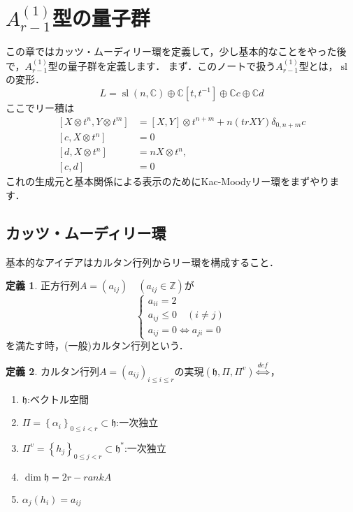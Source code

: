 \documentclass[dvipdfmx,autodetect-engine]{article}
\title{}
\author{}
\date{}
\theoremstyle{definition}
\newtheorem{Def}{定義}
\DeclareMathOperator{\sllie}{sl}
\begin{document}
\section{$A^{(1)}_{r-1}$型の量子群}
    この章ではカッツ・ムーディリー環を定義して，少し基本的なことをやった後で，$A^{(1)}_{r-1}$型の量子群を定義します．
    まず．このノートで扱う$A^{(1)}_{r-1}$型とは，$\sllie$の変形．
    \[
        L = \sllie(n, \mathbb{C}) \oplus \mathbb{C}[t, t^{-1}] \oplus \mathbb{C}c \oplus \mathbb{C}d
    \]
    ここでリー積は
    \begin{align*}
        \left[X \otimes t^{n}, Y \otimes t^{m}\right]
        &=[X, Y] \otimes t^{n+m}+n(t r X Y) \delta_{0, n+m} c\\
        \left[c, X \otimes t^{n}\right]
        &=0 \\
        \left[d, X \otimes t^{n}\right]
        &=n X \otimes t^{n}, \\
        [c, d]
        &=0
    \end{align*}
    これの生成元と基本関係による表示のためにKac-Moodyリー環をまずやります．
\subsection{カッツ・ムーディリー環}
    基本的なアイデアはカルタン行列からリー環を構成すること．
    \begin{Def}
        正方行列$A = (a_{ij}) \quad (a_{ij} \in \mathbb{Z})$が
        \[
            \begin{cases}
                a_{ii} = 2 \\
                a_{ij} \leq 0 \quad (i \neq j) \\
                a_{ij} = 0 \iff a_{ji} = 0
            \end{cases}
        \]
        を満たす時，(一般)カルタン行列という．
    \end{Def}
    
    \begin{Def}
        カルタン行列$A = (a_{ij})_{i \leq i \leq r}$の実現$(\mathfrak{h}, \Pi, \Pi^{v})$$\overset{def}{\iff}$，
        \begin{enumerate}
            \item $\mathfrak{h}$:ベクトル空間
            \item $\Pi=\left\{\alpha_{i}\right\}_{0 \leq i<r} \subset \mathfrak{h}$:一次独立
            \item $\Pi^{v}=\left\{h_{j}\right\}_{0 \leq j<r} \subset \mathfrak{h}^{*}$:一次独立
            \item $\dim\mathfrak{h} = 2r - rankA$
            \item $\alpha_j(h_i) = a_{ij}$
        \end{enumerate}
    \end{Def}
    
\end{document}
